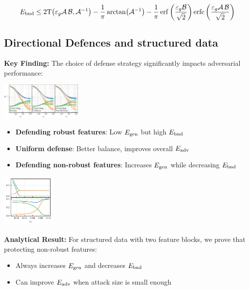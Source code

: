 \documentclass[a0paper,fleqn]{betterportraitposter}
\theoremstyle{plain}
\theoremstyle{definition}
\theoremstyle{remark}
\begin{document}
{\begin{multicols}{3}
\begin{equation}
    \bounderr \leq 2 \mathrm{T}\qty( \advgencost \mathcal{A} \, \mathcal{B}, \mathcal{A}^{-1} ) - \frac{1}{\pi} \arctan( \mathcal{A}^{-1} ) - \frac{1}{\pi} \erf\qty( \frac{\advgencost \mathcal{B}}{\sqrt{2}} ) \erfc\qty( \frac{\advgencost \mathcal{A} \, \mathcal{B}}{\sqrt{2}} )
    \label{eq:bound-boundary-error}
\end{equation}

\subsection{Directional Defences and structured data}

\textbf{Key Finding:} The choice of defense strategy significantly impacts adversarial performance:

\begin{center}
\includegraphics[width=0.3\textwidth]{Assets/defence_sweep.pdf}
\end{center}

\begin{itemize}
    \item \textbf{Defending robust features}: Low $E_{\mathrm{gen}}$ but high $E_{\mathrm{bnd}}$
    \item \textbf{Uniform defense}: Better balance, improves overall $E_{\mathrm{adv}}$
    \item \textbf{Defending non-robust features}: Increases $E_{\mathrm{gen}}$ while decreasing $E_{\mathrm{bnd}}$
\end{itemize}

\begin{center}
\includegraphics[width=0.2\textwidth]{Assets/optimal_defense.pdf}
\end{center}

\textbf{Analytical Result:} For structured data with two feature blocks, we prove that protecting non-robust features:
\begin{itemize}
    \item Always increases $E_{\mathrm{gen}}$ and decreases $E_{\mathrm{bnd}}$
    \item Can improve $E_{\mathrm{adv}}$ when attack size is small enough
\end{itemize}


\end{multicols}}
\end{document}
